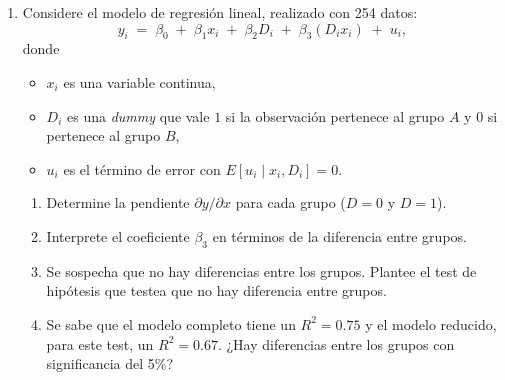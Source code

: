 \documentclass[10pt,a4paper]{article}
\begin{document}
\begin{enumerate}
\item Considere el modelo de regresión lineal, realizado con 254 datos:
\[
y_i \;=\; \beta_0 \;+\; \beta_1 x_i \;+\; \beta_2 D_i \;+\; \beta_3 (D_i x_i) \;+\; u_i,
\]
donde
\begin{itemize}
  \item $x_i$ es una variable continua,
  \item $D_i$ es una \emph{dummy} que vale $1$ si la observación pertenece al grupo $A$ y $0$ si pertenece al grupo $B$,
  \item $u_i$ es el término de error con $E[u_i \mid x_i,D_i]=0$.
\end{itemize}

\begin{enumerate}
  \item[(a)] Determine la pendiente $\partial y / \partial x$ para cada grupo ($D=0$ y $D=1$).
  \item[(b)] Interprete el coeficiente $\beta_3$ en términos de la diferencia entre grupos.
  \item[(c)] Se sospecha que no hay diferencias entre los grupos. Plantee el test de hipótesis que testea que no hay diferencia entre grupos.
  \item[(d)] Se sabe que el modelo completo tiene un $R^2=0.75$ y el modelo reducido, para este test, un $R^2=0.67$. ¿Hay diferencias entre los grupos con significancia del 5\%?
\end{enumerate}


\end{enumerate}

    
\end{document}

